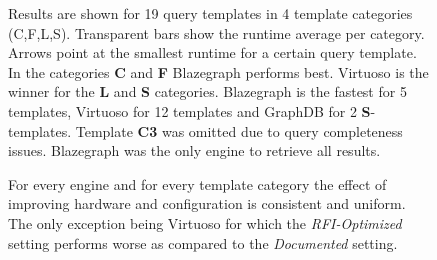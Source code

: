 \documentclass[twocolumn]{bmcart}%
\def\texttt{[image: ]}
\begin{document}
\begin{backmatter}

\begin{figure}[ht!]
	\centering
	\caption{ 
		Results are shown for 19 query templates in 4 template categories (C,F,L,S). Transparent bars show the runtime average per category. Arrows point at the smallest runtime for a certain query template. In the categories \textbf{C} and 
		\textbf{F} Blazegraph performs best. Virtuoso is the winner for the \textbf{L} and \textbf{S} categories. Blazegraph is the fastest for 5 templates, Virtuoso for 12 templates and GraphDB for 2 \textbf{S}-templates.
	    Template \textbf{C3} was omitted due to query completeness issues. Blazegraph was the only engine to retrieve all results. } 
	\label{fig:Fig05_WatdivTemplates}
\end{figure}
 
\begin{figure}[ht!]
	\centering
 	\caption{
 		For every engine and for every template category the effect of improving hardware and configuration is consistent and uniform. The only exception being Virtuoso for which the \emph{RFI-Optimized} setting performs worse as compared to the \emph{Documented} setting.
 		}
 	\label{fig:Fig06_TemplatesVSHardware}
\end{figure}
   

\end{backmatter}
\end{document}
